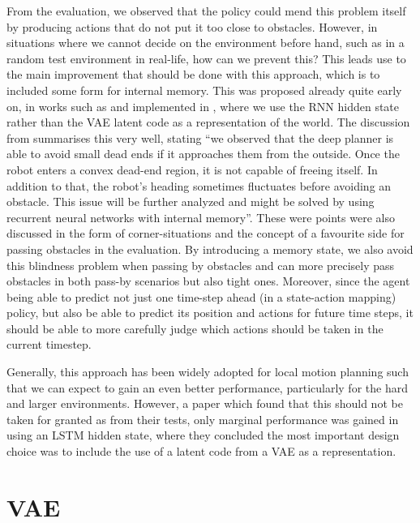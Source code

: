 From the evaluation, we observed that the policy could mend this problem itself by producing actions that do not put it too close to obstacles. However, in situations where we cannot decide on the environment before hand, such as in a random test environment in real-life, how can we prevent this?
This leads use to the main improvement that should be done with this approach, which is to included some form for internal memory. This was proposed already quite early on, in works such as \cite{pfeiffer2017perception} and implemented in \cite{worldModels2018}, where we use the RNN hidden state rather than the VAE latent code as a representation of the world. The discussion from \cite{pfeiffer2017perception} summarises this very well, stating ``we observed that the deep planner is able to avoid small dead ends if it approaches them from the outside. Once the robot enters a convex dead-end region, it is not capable of freeing itself. In addition to that, the robot’s heading sometimes fluctuates before avoiding an obstacle. This issue will be further analyzed and might be solved by using recurrent neural networks with internal memory''.
These were points were also discussed in the form of corner-situations and the concept of a favourite side for passing obstacles in the evaluation. By introducing a memory state, we also avoid this blindness problem when passing by obstacles and can more precisely pass obstacles in both pass-by scenarios but also tight ones. Moreover, since the agent being able to predict not just one time-step ahead (in a state-action mapping) policy, but also be able to predict its position and actions for future time steps, it should be able to more carefully judge which actions should be taken in the current timestep.

Generally, this approach has been widely adopted for local motion planning \cite{deepCollisionPredictorOracle, Badgr, LearningStateRepresentation} such that we can expect to gain an even better performance, particularly for the hard and larger environments. However, a paper which found that this should not be taken for granted as from their tests, only marginal performance was gained in using an LSTM hidden state, where they concluded the most important design choice was to include the use of a latent code from a VAE as a representation.



\section{VAE}


